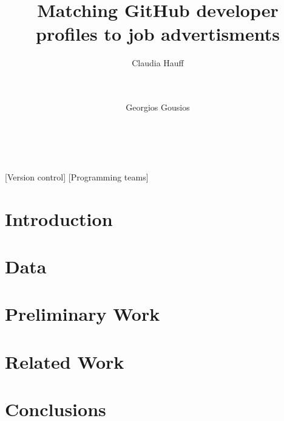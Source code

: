 \documentclass{sig-alternate}
\begin{document}
\newcommand{\ghtorrent}{ \textsc{ght}orrent\xspace}
\newcommand{\api}{\textsc{api}\xspace}

\newcommand{\nb}[3]{
  \fcolorbox{black}{#2}{\bfseries\sffamily\scriptsize#1}
    {\sf\small$\blacktriangleright$\textit{#3}$\blacktriangleleft$}
}

\newcommand\georgios[1]{\nb{Georgios}{yellow}{#1}}
\newcommand\alberto[1]{\nb{Claudia}{cyan}{#1}}


\newcommand{\hassanbox}[1]
{
  \vspace{0.29em}
  \noindent
  \fbox{
  \begin{minipage}{0.46\textwidth}
    \emph{\noindent #1}
    \end{minipage}
}}

\newcommand{\resp}[2]{{\sc R#1:} ``\emph{#2}''}
\newcommand{\respnum}[1]{{\sc R#1}}
\newcommand{\code}[1]{{\textsl{#1}}}

\title{Matching GitHub developer profiles to job advertisments}

\author{
\alignauthor
Claudia Hauff\\
       \\
       \\
\and
Georgios Gousios\\
       \\
       \\
}

\maketitle

\begin{abstract}

\end{abstract}

[Version control]
[Programming teams]



\section{Introduction}

\section{Data}

\section{Preliminary Work}

\section{Related Work}

\section{Conclusions}



\end{document}
